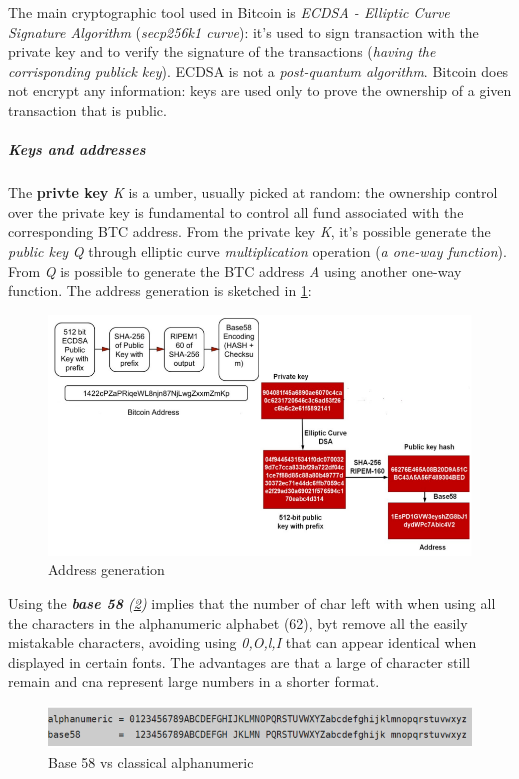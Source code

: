 \documentclass[10pt,a4paper]{report}
\begin{document}
The main cryptographic tool used in Bitcoin is \textit{ECDSA - Elliptic Curve Signature Algorithm} (\textit{secp256k1 curve}): it's used to sign transaction with the private key and to verify the signature of the transactions (\textit{having the corrisponding publick key}). ECDSA is not a \textit{post-quantum algorithm}.
Bitcoin does not encrypt any information: keys are used only to prove the ownership of a given transaction that is public.
\subparagraph{Keys and addresses}\label{sec:keys-and-addresses}
The \textbf{privte key} \textit{K} is a umber, usually picked at random: the ownership control over the private key is fundamental to control all fund associated with the corresponding BTC address.
From the private key \textit{K}, it's possible generate the \textit{public key} \textit{Q} through elliptic curve \textit{multiplication} operation (\textit{a one-way function}). From \textit{Q} is possible to generate the BTC address \textit{A} using another one-way function.
The address generation is sketched in \ref{address-generation-btc}:
\begin{figure}[h]
	\centering
	\includegraphics[scale=0.45]{images/Pasted image 20230329115703.png}
	\caption{Address generation}
	\label{address-generation-btc}

\end{figure}
\clearpage

Using the \textit{\textbf{base 58} (\ref{base58})} implies that the number of char left with when using all the characters in the alphanumeric alphabet (62), byt remove all the easily mistakable characters, avoiding using \textit{0,O,l,I} that can appear identical when displayed in certain fonts.
The advantages are that a large of character still remain and cna represent large numbers in a shorter format.
\begin{figure}
	\centering
	\includegraphics[scale=0.50]{images/Pasted image 20230329115921.png}
	\caption{Base 58 vs classical alphanumeric}
	\label{base58}
\end{figure}
\end{document}
